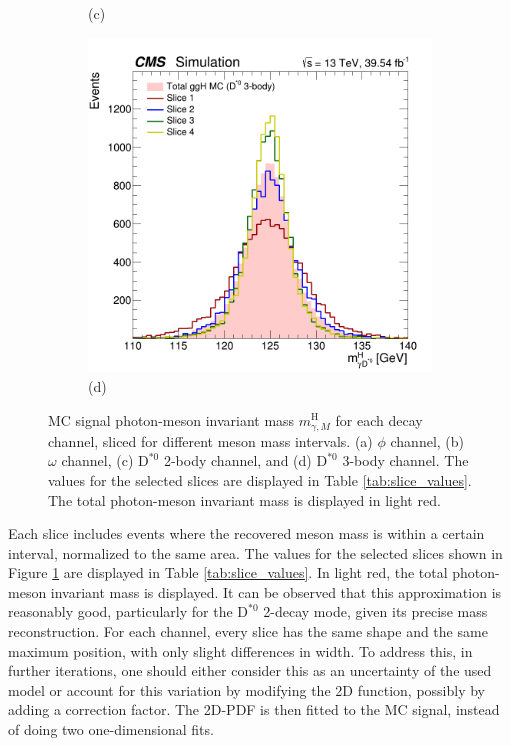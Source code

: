 \begin{figure}[!ht]
\begin{subfigure}[t]{0.50\mylength}
        \vspace*{-0.2cm}
        \caption{\footnotesize (c)}
    \end{subfigure}%
    \begin{subfigure}[t]{0.50\mylength}
        \centering
        \includegraphics[width=0.49\mylength]{resources/plots/D0Star_3body_fit_SGN_MH_sliced.png}
        \vspace*{-0.2cm}
        \caption{\footnotesize (d)}
    \end{subfigure}%
\caption{MC signal photon-meson invariant mass $m^{\text{H}}_{\gamma, M}$ for each decay channel, sliced for different meson mass intervals. (a) $\phi$ channel, (b) $\omega$ channel, (c) $\text{D}^{*0}$ 2-body channel, and (d) $\text{D}^{*0}$ 3-body channel.  The values for the selected slices are displayed in Table \ref{tab:slice_values}. The total photon-meson invariant mass is displayed in light red.}
\label{fig:sig_modelling_sliced}
    \vspace*{-0.0cm}
\end{figure}
Each slice includes events where the recovered meson mass is within a certain interval, normalized to the same area. The values for the selected slices shown in Figure \ref{fig:sig_modelling_sliced} are displayed in Table \ref{tab:slice_values}. In light red, the total photon-meson invariant mass is displayed. It can be observed that this approximation is reasonably good, particularly for the $\text{D}^{*0}$ 2-decay mode, given its precise mass reconstruction. For each channel, every slice has the same shape and the same maximum position, with only slight differences in width. To address this, in further iterations, one should either consider this as an uncertainty of the used model or account for this variation by modifying the 2D function, possibly by adding a correction factor. The 2D-PDF is then fitted to the MC signal, instead of doing two one-dimensional fits.
